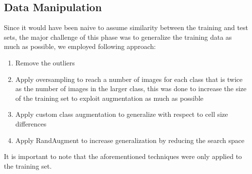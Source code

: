\documentclass[11pt]{article}
\begin{document}
\begin{multicols}{2}
        \subsection{Data Manipulation}
        Since it would have been naive to assume similarity between the training and test sets, the major challenge of this phase was to generalize the training data as much as possible, we employed following approach:
        \begin{enumerate}
            \item Remove the outliers
            \item Apply oversampling to reach a number of images for each class that is twice as the number of images in the larger class, this was done to increase the size of the training set to exploit augmentation as much as possible
            \item Apply custom class augmentation to generalize with respect to cell size differences
            \cite{lee2023classadaptive}
            \item Apply RandAugment to increase generalization by reducing the search space \cite{cubuk2020randaugment}
        \end{enumerate}
        It is important to note that the aforementioned techniques were only applied to the training set.
        

\end{multicols}
\end{document}
